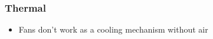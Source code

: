\begin{comment}
\subsubsection{Mechanical }

\begin{itemize}
    \item Friendship
    \item Sleep deprivation
\end{itemize}
 \end{comment}

\subsubsection{Thermal }
\begin{itemize}
    \item Fans don't work as a cooling mechanism without air
\end{itemize}
